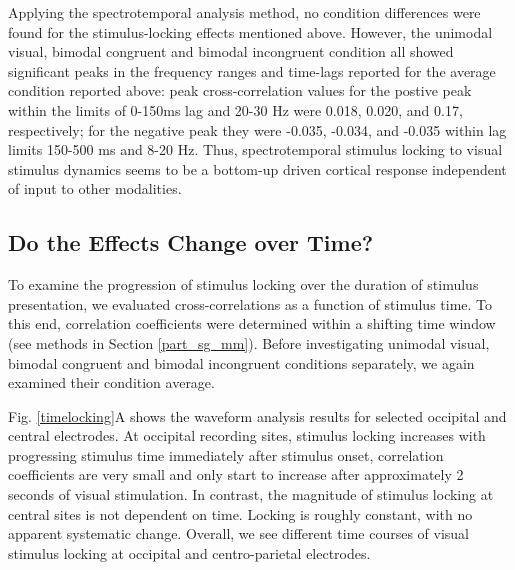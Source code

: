 Applying the spectrotemporal analysis method, no condition differences were
found for the stimulus-locking effects mentioned above. However, the
unimodal visual, bimodal congruent and bimodal incongruent condition all
showed significant peaks in the frequency ranges and time-lags reported for
the average condition reported above: peak cross-correlation values for the
postive peak within the limits of 0-150ms lag and 20-30 Hz were 0.018,
0.020, and 0.17, respectively; for the negative peak they were -0.035,
-0.034, and -0.035 within lag limits 150-500 ms and 8-20 Hz. Thus,
spectrotemporal stimulus locking to visual stimulus dynamics seems to be a
bottom-up driven cortical response independent of input to other
modalities.

\subsection{Do the Effects Change over Time?}

To examine the progression of stimulus locking over the duration of
stimulus presentation, we evaluated cross-correlations as a function of
stimulus time. To this end, correlation coefficients were determined within
a shifting time window (see methods in Section \ref{part_sg_mm}). Before
investigating unimodal visual, bimodal congruent and bimodal incongruent
conditions separately, we again examined their condition average.

Fig. \ref{timelocking}A shows the waveform analysis results for selected occipital and
central electrodes. At occipital recording sites, stimulus locking
increases with progressing stimulus time \textemdash immediately after
stimulus onset, correlation coefficients are very small and only start to
increase after approximately 2 seconds of visual stimulation. In contrast,
the magnitude of stimulus locking at central sites is not dependent on
time. Locking is roughly constant, with no apparent systematic change.
Overall, we see different time courses of visual stimulus locking at
occipital and centro-parietal electrodes.

